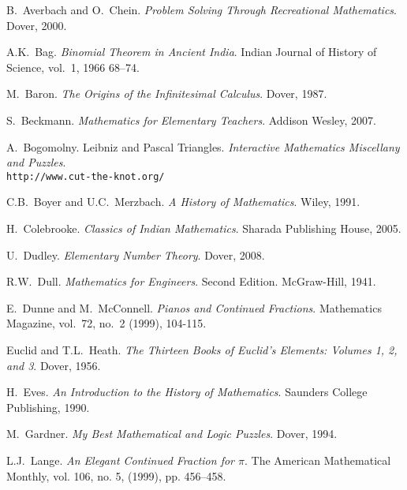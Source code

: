 


\begin{fullwidth}

\begin{thebibliography}{99}

 B.\ Averbach and O.\ Chein. \emph{Problem Solving Through Recreational Mathematics}. Dover, 2000.

 A.K.\ Bag. \emph{Binomial Theorem in Ancient India}. Indian Journal of History of Science, vol.\ 1,  1966 68--74. 

 M.\ Baron. \emph{The Origins of the Infinitesimal Calculus}. Dover, 1987.

 S.\ Beckmann. \emph{Mathematics for Elementary
  Teachers}. Addison Wesley, 2007.

 A.\ Bogomolny. Leibniz and Pascal Triangles. \emph{Interactive Mathematics Miscellany and Puzzles}.
\\ \texttt{http://www.cut-the-knot.org/}

 C.B.\ Boyer and U.C.\ Merzbach. \emph{A History of Mathematics}. Wiley, 1991.

 H.\ Colebrooke. \emph{Classics of Indian Mathematics}. 
Sharada Publishing House, 2005.

 U.\ Dudley. \emph{Elementary Number Theory}. Dover,
  2008.

 R.W.\ Dull. \emph{Mathematics for Engineers}. Second
  Edition. McGraw-Hill, 1941.

E.\ Dunne and M.\ McConnell. \emph{Pianos and Continued
Fractions}. Mathematics Magazine, vol.\ 72, no.\ 2 (1999), 104-115.

 Euclid and T.L.\ Heath. \emph{The Thirteen Books of Euclid's Elements: Volumes 1, 2, and 3}. Dover, 1956. 

 H.\ Eves. \emph{An Introduction to the History of Mathematics}. Saunders College Publishing, 1990.

 M.\ Gardner. \emph{My Best Mathematical and Logic
  Puzzles}. Dover, 1994.

 L.J.\ Lange. \emph{An Elegant Continued Fraction for {$\pi$}}. The American Mathematical Monthly, vol. 106, no. 5, (1999), pp. 456--458.


\end{thebibliography}
\end{fullwidth}
